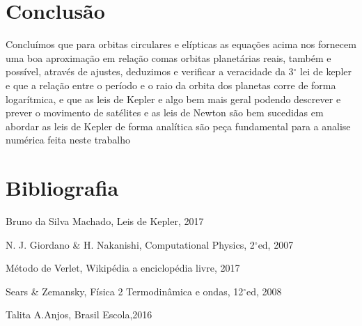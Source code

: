 \documentclass[a4paper]{article} %
\begin{document}
\section{Conclus\~{a}o}

Conclu\'{i}mos que para orbitas circulares e elípticas as equações acima nos fornecem uma boa aproximação em relação comas orbitas planetárias reais, também e possível, através de ajustes, deduzimos e verificar a veracidade da 3$^\circ$ lei de kepler e que a relação entre o período e o raio da orbita dos planetas corre de forma logarítmica, e que as leis de Kepler e algo bem mais geral podendo descrever e prever o movimento de satélites e as leis de Newton são bem sucedidas em abordar as leis de Kepler de forma analítica são peça fundamental para a analise numérica feita neste trabalho



\section{Bibliografia}

\noindent 

\indent Bruno da Silva Machado, Leis de Kepler, 2017

\indent N. J. Giordano \& H. Nakanishi, Computational Physics, 2${}^\circ$ed, 2007

\indent  M\'etodo de Verlet, Wikip\'edia a enciclop\'edia livre, 2017

\indent Sears \& Zemansky, F\'{i}sica 2 Termodin\^{a}mica e ondas, 12${}^\circ$ed, 2008

\indent Talita A.Anjos, Brasil Escola,2016
\end{document}
